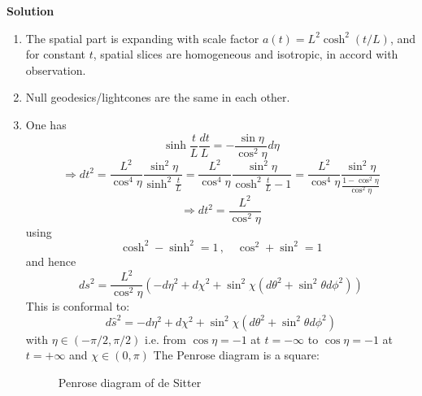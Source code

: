 \documentclass[12pt]{article}
\newcommand{\be}{\begin{equation}}
\newcommand{\ee}{\end{equation}}
\begin{document}
\color{red}
{\bf Solution}
\begin{enumerate}[label=\alph*)]
\item The spatial part is expanding with scale factor $a(t) = L^2 \cosh^2 (t/L)$, and for constant $t$, spatial slices are homogeneous and isotropic, in accord with observation. 
\item Null geodesics/lightcones are the same in each other. 
\item 
One has
\be
\sinh \frac{t}{L} \frac{dt}{L} = - \frac{\sin \eta}{\cos^2 \eta} d \eta 
\ee
\be
\Rightarrow dt^2 = \frac{L^2}{\cos^4 \eta} \frac{\sin^2 \eta}{\sinh^2 \frac{t}{L}} = \frac{L^2}{\cos^4 \eta} \frac{\sin^2 \eta}{\cosh^2 \frac{t}{L} - 1}
=  \frac{L^2}{\cos^4 \eta} \frac{\sin^2 \eta}{\frac{1-\cos^2 \eta}{\cos^2 \eta}}
\ee
\be
\Rightarrow dt^2 = \frac{L^2}{\cos^2 \eta} 
\ee
using
\be
\cosh^2 - \sinh^2 = 1 \,,\quad \cos^2 + \sin^2 = 1 
\ee
and hence 
\be
ds^2 = \frac{L^2}{\cos^2 \eta} \left( - d\eta^2 + d\chi^2 + \sin^2 \chi \left( d\theta^2 + \sin^2\theta d\phi^2 \right) \right)
\ee
This is conformal to:
\be
d\hat s^2 = 
 - d\eta^2 + d\chi^2 + \sin^2 \chi \left( d\theta^2 + \sin^2\theta d\phi^2 \right)
\ee
with $\eta \in (-\pi/2,\pi/2)$ i.e. from $\cos \eta = -1$ at $t=-\infty$ to $\cos \eta = -1$ at $t=+\infty$ and $\chi \in (0,\pi)$
The Penrose diagram is a square:
\color{black}

\begin{figure}[ht]
\centering
{}
\caption{Penrose diagram of de Sitter}
\label{pends} 
\end{figure}

\begin{figure}[ht]
\centering
{}
\end{figure}
\end{enumerate}
\end{document}
